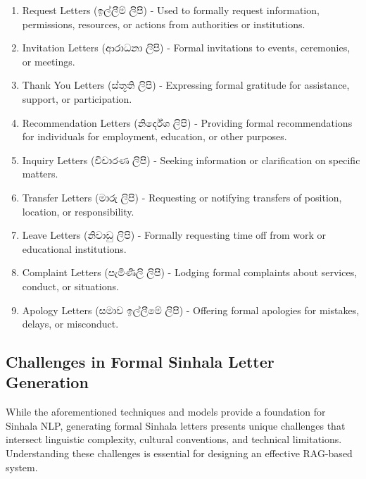 \documentclass[12pt]{uomthesis}
\newcommand{\si}[1]{{\sinhalafont #1}}
\begin{document}
\begin{enumerate}
    \item Request Letters (\si{ඉල්ලීම් ලිපි}) - Used to formally request information, permissions, resources, or actions from authorities or institutions.
    \item Invitation Letters (\si{ආරාධනා ලිපි}) - Formal invitations to events, ceremonies, or meetings.
    \item Thank You Letters (\si{ස්තූති ලිපි}) - Expressing formal gratitude for assistance, support, or participation.
    \item Recommendation Letters (\si{නිර්දේශ ලිපි}) - Providing formal recommendations for individuals for employment, education, or other purposes.
    \item Inquiry Letters (\si{විචාරණ ලිපි}) - Seeking information or clarification on specific matters.
    \item Transfer Letters (\si{මාරු ලිපි}) - Requesting or notifying transfers of position, location, or responsibility.
    \item Leave Letters (\si{නිවාඩු ලිපි}) - Formally requesting time off from work or educational institutions.
    \item Complaint Letters (\si{පැමිණිලි ලිපි}) - Lodging formal complaints about services, conduct, or situations.
    \item Apology Letters (\si{සමාව ඉල්ලීමේ ලිපි}) - Offering formal apologies for mistakes, delays, or misconduct.
\end{enumerate}

\subsection{Challenges in Formal Sinhala Letter Generation}
While the aforementioned techniques and models provide a foundation for Sinhala NLP, generating formal Sinhala letters presents unique challenges that intersect linguistic complexity, cultural conventions, and technical limitations. Understanding these challenges is essential for designing an effective RAG-based system.
\end{document}
